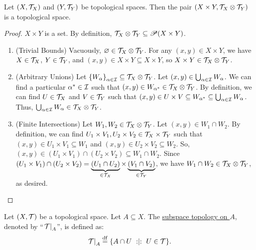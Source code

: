 \documentclass[11pt,reqno]{amsart}
\begin{document}
\begin{Prop}\label{prop:prod-topo}
Let $(X,\mathcal{T}_X)$ and $(Y,\mathcal{T}_Y)$ be topological spaces.
Then the pair $(X\times Y,\mathcal{T}_X\otimes\mathcal{T}_Y)$ is a topological space.
\end{Prop}
\begin{proof}
$X\times Y$ is a set.
By definition, $\mathcal{T}_X\otimes\mathcal{T}_Y\subseteq\mathscr{P}(X\times Y)$.

\begin{enumerate}
\item (Trivial Bounds) Vacuously, $\varnothing\in\mathcal{T}_X\otimes\mathcal{T}_Y$.
For any $(x,y)\in X\times Y$, we have $X\in\mathcal{T}_X$, $Y\in\mathcal{T}_Y$, and
$(x,y)\in X\times Y\subseteq X\times Y$, so $X\times Y\in\mathcal{T}_X\otimes\mathcal{T}_Y$.

\item (Arbitrary Unions)
Let $\set{W_\alpha}_{\alpha\in\I}\subseteq\T_X\otimes\T_Y$.
Let $(x,y)\in\bigcup_{\alpha\in\mathcal{I}}W_\alpha$.
We can find a particular $\alpha^*\in\mathcal{I}$ such that
$(x,y)\in W_{\alpha^*}\in\mathcal{T}_X\otimes\mathcal{T}_Y$.
By definition, we can find $U\in\mathcal{T}_X$ and $V\in\mathcal{T}_Y$ such that
$(x,y)\in U\times V\subseteq W_{\alpha^*}\subseteq\bigcup_{\alpha\in\mathcal{I}}W_\alpha$.
Thus, $\bigcup_{\alpha\in\mathcal{I}}W_\alpha\in\mathcal{T}_X\otimes\mathcal{T}_Y$.

\item (Finite Intersections)
Let $W_1,W_2\in\mathcal{T}_X\otimes\mathcal{T}_Y$.
Let $(x,y)\in W_1\cap W_2$.
By definition, we can find $U_1\times V_1,U_2\times V_2\in\mathcal{T}_X\times\mathcal{T}_Y$
such that $(x,y)\in U_1\times V_1\subseteq W_1$
and $(x,y)\in U_2\times V_2\subseteq W_2$.
So, $(x,y)\in (U_1\times V_1)\cap(U_2\times V_2)
\subseteq W_1\cap W_2$. Since
$
(U_1\times V_1)\cap(U_2\times V_2)
=
\underbrace{(U_1\cap U_2)}_{\in\mathcal{T}_X}\times\underbrace{(V_1\cap V_2)}_{\in\mathcal{T}_Y}
$,
we have $W_1\cap W_2\in\mathcal{T}_X\otimes\mathcal{T}_Y$,
as desired.
\end{enumerate}
\end{proof}

\begin{Def}
Let $(X,\mathcal{T})$ be a topological space. Let $A\subseteq X$.
The \ul{subspace topology on $A$}, denoted by ``$\eval{\T}_A$'', is defined
as:
\[\eval{\T}_A\df\set{A\cap U\st U\in\T}.\]
\end{Def}
\end{document}
